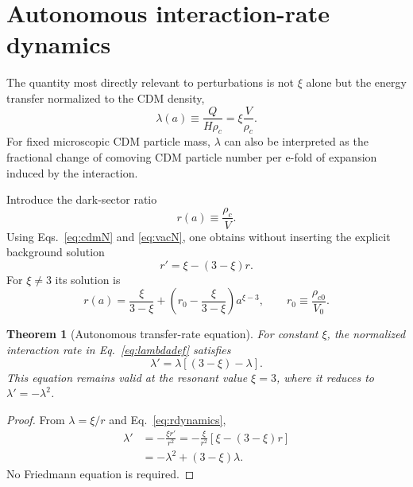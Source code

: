 \documentclass[11pt]{article}
\newtheorem{theorem}{Theorem}[section]
\theoremstyle{remark}
\begin{document}
\section{Autonomous interaction-rate dynamics}
\label{sec:lambda}

The quantity most directly relevant to perturbations is not $\xi$ alone but the energy transfer normalized to the CDM density,
\begin{equation}
    \lambda(a)
    \equiv\frac{Q}{H\rho_c}
    =\xi\frac{V}{\rho_c}.
    \label{eq:lambdadef}
\end{equation}
For fixed microscopic CDM particle mass, $\lambda$ can also be interpreted as the fractional change of comoving CDM particle number per e-fold of expansion induced by the interaction.

Introduce the dark-sector ratio
\begin{equation}
    r(a)\equiv\frac{\rho_c}{V}.
    \label{eq:rdef}
\end{equation}
Using Eqs.~\eqref{eq:cdmN} and \eqref{eq:vacN}, one obtains without inserting the explicit background solution
\begin{equation}
    r'=\xi-(3-\xi)r.
    \label{eq:rdynamics}
\end{equation}
For $\xi\neq3$ its solution is
\begin{equation}
    r(a)=\frac{\xi}{3-\xi}
    +\left(r_0-\frac{\xi}{3-\xi}\right)a^{\xi-3},
    \qquad r_0\equiv\frac{\rho_{c0}}{V_0}.
    \label{eq:rsolution}
\end{equation}

\begin{theorem}[Autonomous transfer-rate equation]
\label{thm:logistic}
For constant $\xi$, the normalized interaction rate in Eq.~\eqref{eq:lambdadef} satisfies
\begin{equation}
    \boxed{
    \lambda'=\lambda\left[(3-\xi)-\lambda\right]
    .}
    \label{eq:logistic}
\end{equation}
This equation remains valid at the resonant value $\xi=3$, where it reduces to $\lambda'=-\lambda^2$.
\end{theorem}

\begin{proof}
From $\lambda=\xi/r$ and Eq.~\eqref{eq:rdynamics},
\begin{align}
    \lambda'
    &=-\frac{\xi r'}{r^2}
    =-\frac{\xi}{r^2}\left[\xi-(3-\xi)r\right]\nonumber\\
    &=-\lambda^2+(3-\xi)\lambda.
\end{align}
No Friedmann equation is required.
\end{proof}
\end{document}
